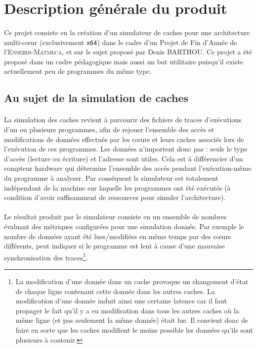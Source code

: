 \section{Description générale du produit}

\paragraph{}
Ce projet consiste en la création d'un simulateur de caches pour une architecture multi-c\oe ur (exclusivement \verb!x64!) dans le cadre d'un Projet de Fin d'Année de l'\textsc{Enseirb-Matmeca}, et sur le sujet proposé par Denis BARTHOU. Ce projet a été proposé dans un cadre pédagogique mais aussi un but utilitaire puisqu'il existe actuellement peu de programmes du même type.

\subsection{Au sujet de la simulation de caches}

\paragraph{}
La simulation des caches revient à parcourir des fichiers de traces d'exécutions d'un ou plusieurs programmes, afin de rejouer l'ensemble des accès et modifications de données effectués par les c\oe urs et leurs caches associés lors de l'exécution de ces programmes. Les données n'importent donc pas : seuls le type d'accès (lecture ou écriture) et l'adresse sont utiles. Cela est à différencier d'un compteur hardware qui détermine l'ensemble des accès pendant l'exécution-même du programme à analyser. Par conséquent le simulateur est totalement indépendant de la machine sur laquelle les programmes ont été exécutés (à condition d'avoir suffisamment de ressources pour simuler l'architecture).   

\paragraph{}
Le résultat produit par le simulateur consiste en un ensemble de nombres évaluant des métriques configurées pour une simulation donnée. Par exemple le nombre de données ayant été lues/modifiées en même temps par des c\oe urs différents, peut indiquer si le programme est lent à cause d'une mauvaise synchronisation des traces\footnote{La modification d'une donnée dans un cache provoque un changement d'état de chaque ligne contenant cette donnée dans les autres caches. La modification d'une donnée induit ainsi une certaine latence car il faut propager le fait qu'il y a eu modification dans tous les autres caches où la même ligne (et pas seulement la même donnée) était lue. Il convient donc de faire en sorte que les caches modifient le moins possible les données qu'ils sont plusieurs à contenir.}.

